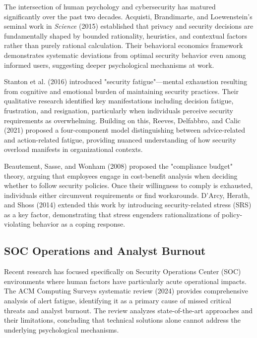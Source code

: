 \documentclass[11pt, a4paper]{article}
\begin{document}
The intersection of human psychology and cybersecurity has matured significantly over the past two decades. Acquisti, Brandimarte, and Loewenstein's seminal work in \textit{Science} (2015)\cite{acquisti2015privacy} established that privacy and security decisions are fundamentally shaped by bounded rationality, heuristics, and contextual factors rather than purely rational calculation. Their behavioral economics framework demonstrates systematic deviations from optimal security behavior even among informed users, suggesting deeper psychological mechanisms at work.

Stanton et al. (2016)\cite{stanton2016security} introduced "security fatigue"—mental exhaustion resulting from cognitive and emotional burden of maintaining security practices. Their qualitative research identified key manifestations including decision fatigue, frustration, and resignation, particularly when individuals perceive security requirements as overwhelming. Building on this, Reeves, Delfabbro, and Calic (2021)\cite{reeves2021encouraging} proposed a four-component model distinguishing between advice-related and action-related fatigue, providing nuanced understanding of how security overload manifests in organizational contexts.

Beautement, Sasse, and Wonham (2008)\cite{beautement2008compliance} proposed the "compliance budget" theory, arguing that employees engage in cost-benefit analysis when deciding whether to follow security policies. Once their willingness to comply is exhausted, individuals either circumvent requirements or find workarounds. D'Arcy, Herath, and Shoss (2014)\cite{darcy2014security} extended this work by introducing security-related stress (SRS) as a key factor, demonstrating that stress engenders rationalizations of policy-violating behavior as a coping response.

\subsection{SOC Operations and Analyst Burnout}

Recent research has focused specifically on Security Operations Center (SOC) environments where human factors have particularly acute operational impacts. The ACM Computing Surveys systematic review (2024)\cite{gupta2024alert} provides comprehensive analysis of alert fatigue, identifying it as a primary cause of missed critical threats and analyst burnout. The review analyzes state-of-the-art approaches and their limitations, concluding that technical solutions alone cannot address the underlying psychological mechanisms.
\end{document}
